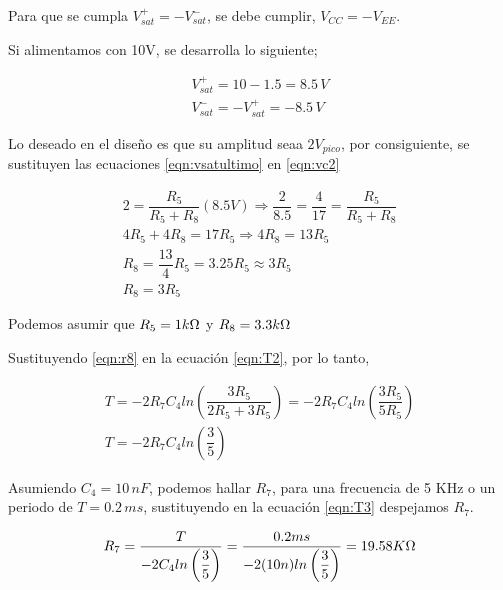 \begin{enumerate}
\begin{itemize}
                        Para que se cumpla  $V_{sat}^+=-V_{sat}^-$, se debe cumplir,
                        $V_{CC}=-V_{EE}$.

                        Si alimentamos con 10V, se desarrolla lo siguiente;

                        \begin{gather}
                            V_{sat}^+=10-1.5=8.5 \, V \label{eqn:vsatultimo} \\[0.5cm]
                            V_{sat}^-=-V_{sat}^+=-8.5 \, V \label{eqn:vsatultimo2}
                        \end{gather}

                        Lo deseado en el diseño es que su amplitud seaa $2V_{pico}$, por consiguiente, se sustituyen las ecuaciones \ref{eqn:vsatultimo} en \ref{eqn:vc2}

                        \begin{gather}
                            2=\dfrac{R_5}{R_5+R_8}(8.5V) \Rightarrow \dfrac{2}{8.5}=\dfrac{4}{17}=\dfrac{R_5}{R_5+R_8} \nonumber \\[0.5cm]
                            4R_5+4R_8=17R_5 \Rightarrow 4R_8=13R_5 \nonumber \\[0.5cm]
                            R_8=\dfrac{13}{4}R_5=3.25R_5 \approx 3R_5 \nonumber \\[0.5cm]
                            R_8=3R_5 \label{eqn:r8}
                        \end{gather}

                        Podemos asumir que $R_5=1k \ohm$ y $R_8=3.3k \ohm$

                        Sustituyendo \ref{eqn:r8} en la ecuación \ref{eqn:T2}, por lo tanto,

                        \begin{gather}
                            T=-2R_7C_4ln\left(\dfrac{3R_5}{2R_5+3R_5}\right)=-2R_7C_4ln\left(\dfrac{3R_5}{5R_5}\right) \nonumber \\[0.5cm]
                            T=-2R_7C_4ln\left(\dfrac{3}{5}\right) \label{eqn:T3}
                        \end{gather}

                        Asumiendo $C_4=10 \, nF$, podemos hallar $R_7$, para una frecuencia de 5 KHz o un periodo de $T=0.2 \, ms$, sustituyendo en la ecuación \ref{eqn:T3} despejamos $R_7$.

                        \begin{gather}
                            R_7=\dfrac{T}{-2C_4ln\left(\dfrac{3}{5}\right) }=\dfrac{0.2 ms}{-2(10n)ln\left(\dfrac{3}{5}\right)}=19.58 K \ohm        
                        \end{gather}


\end{itemize}
\end{enumerate}
